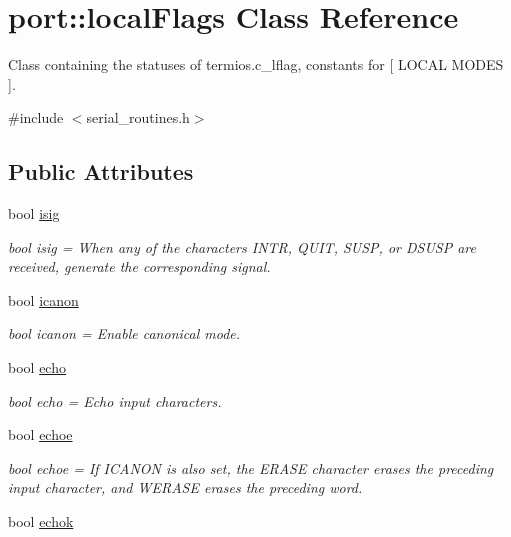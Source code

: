 \hypertarget{classport_1_1localFlags}{}\section{port\+:\+:local\+Flags Class Reference}
\label{classport_1_1localFlags}


Class containing the statuses of termios.\+c\+\_\+lflag, constants for \mbox{[} L\+O\+C\+AL M\+O\+D\+ES \mbox{]}.  




{\ttfamily \#include $<$serial\+\_\+routines.\+h$>$}

\subsection*{Public Attributes}
\begin{DoxyCompactItemize}
\item 
bool \hyperlink{classport_1_1localFlags_a7f2f72947d3b62649d50d4d7931d78bd}{isig}
\begin{DoxyCompactList}\small\item\em bool isig = When any of the characters I\+N\+TR, Q\+U\+IT, S\+U\+SP, or D\+S\+U\+SP are received, generate the corresponding signal. \end{DoxyCompactList}\item 
bool \hyperlink{classport_1_1localFlags_ab26f2ad4df346449c9cde1d060cb0e98}{icanon}
\begin{DoxyCompactList}\small\item\em bool icanon = Enable canonical mode. \end{DoxyCompactList}\item 
bool \hyperlink{classport_1_1localFlags_a2c231fce7fa4a5ec4125af1d1ae31da5}{echo}
\begin{DoxyCompactList}\small\item\em bool echo = Echo input characters. \end{DoxyCompactList}\item 
bool \hyperlink{classport_1_1localFlags_aaf0665b2b3f32a5c423924acdc26c0bf}{echoe}
\begin{DoxyCompactList}\small\item\em bool echoe = If I\+C\+A\+N\+ON is also set, the E\+R\+A\+SE character erases the preceding input character, and W\+E\+R\+A\+SE erases the preceding word. \end{DoxyCompactList}\item 
bool \hyperlink{classport_1_1localFlags_ac68cbd1d58782fb5bc27ba85af026c30}{echok}

\end{DoxyCompactItemize}
